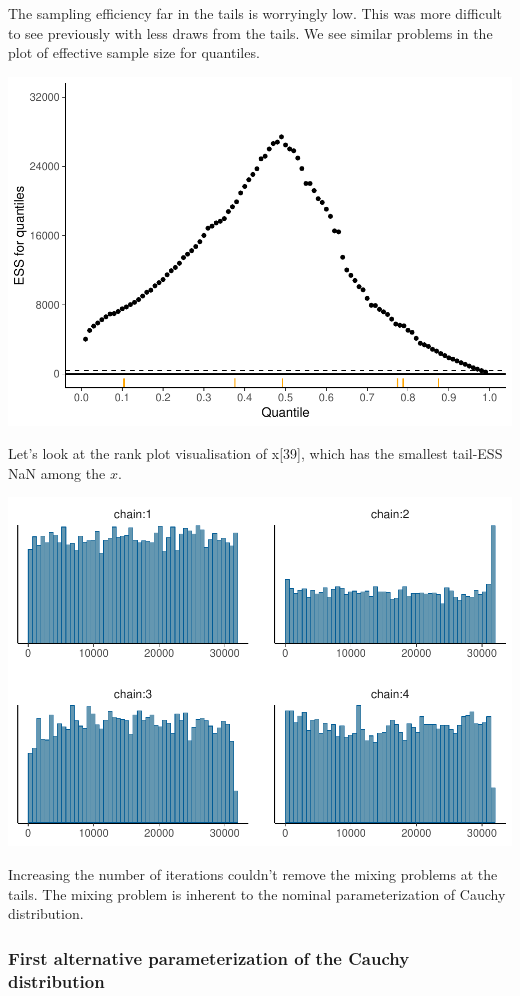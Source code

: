 \documentclass[american,]{article}
\begin{document}
The sampling efficiency far in the tails is worryingly low. This was
more difficult to see previously with less draws from the tails. We see
similar problems in the plot of effective sample size for quantiles.

\includegraphics{graphics/quantile-ess-fit-nom-td20l-finer-1.pdf}

Let's look at the rank plot visualisation of x{[}39{]}, which has the
smallest tail-ESS NaN among the \(x\).

\includegraphics{graphics/hist-fit-nom-td20l-1.pdf}

Increasing the number of iterations couldn't remove the mixing problems
at the tails. The mixing problem is inherent to the nominal
parameterization of Cauchy distribution.

\hypertarget{first-alternative-parameterization-of-the-cauchy-distribution}{%
\subsubsection*{First alternative parameterization of the Cauchy
distribution}\label{first-alternative-parameterization-of-the-cauchy-distribution}}
\end{document}

